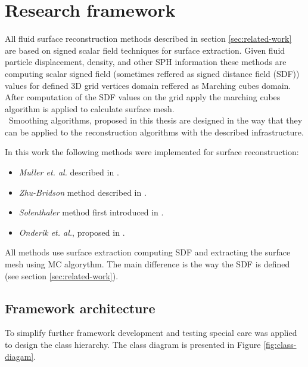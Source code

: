 \chapter{Research framework}
All fluid surface reconstruction methods described in section \ref{sec:related-work} are based on signed scalar field techniques for surface extraction. Given fluid particle displacement, density, and other SPH information these methods are computing scalar signed field (sometimes reffered as signed distance field (SDF)) values for defined 3D grid vertices domain reffered as Marching cubes domain. After computation of the SDF values on the grid apply the marching cubes algorithm is applied to calculate surface mesh.\\\
Smoothing algorithms, proposed in this thesis are designed in the way that they can be applied to the reconstruction algorithms with the described infrastructure.


In this work the following methods were implemented for surface reconstruction:
\begin{itemize}
  \item \emph{Muller et. al.} described in \cite{Muller}.
  \item \emph{Zhu-Bridson} method described in \cite{ZhuBridson}.
  \item \emph{Solenthaler} method first introduced in \cite{Solenthaler}.
  \item \emph{Onderik et. al.}, proposed in \cite{OnderikEtAl}.
\end{itemize}
All methods use surface extraction computing SDF and extracting the surface mesh using MC algorythm. The main difference is the way the SDF is defined (see section \ref{sec:related-work}).



\section{Framework architecture}
To simplify further framework development and testing special care was applied to design the class hierarchy. The class diagram is presented in Figure \ref{fig:class-diagam}.

